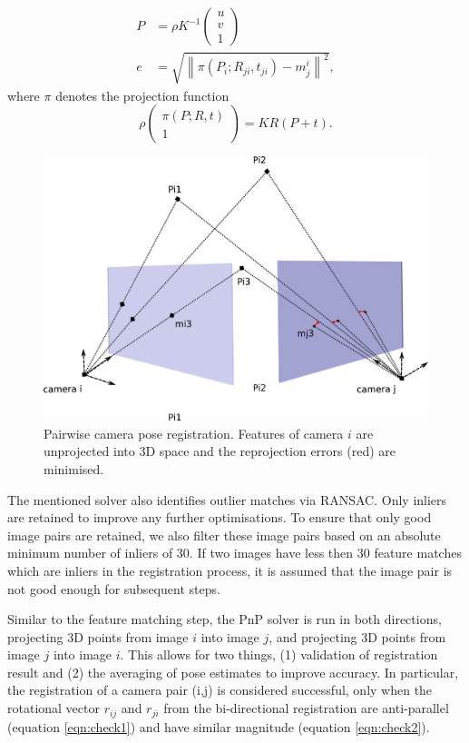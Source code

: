 \documentclass[10pt,twocolumn,letterpaper]{article}
\newcommand{\norm}[1]{\left\lVert #1 \right\rVert}
\begin{document}
\begin{align}
P &= \rho K^{-1} \begin{pmatrix}
u\\v\\1
\end{pmatrix} \label{eqn:backprojection}\\
e &= \sqrt{\norm{\pi\left(P_{i};R_{ji},t_{ji}\right)-m^i_{j}}^2},\label{eqn:reprojerror}
\end{align}
where $\pi$ denotes the projection function \[
\rho
\begin{pmatrix}
\pi\left(P;R,t\right)\\1
\end{pmatrix} = KR\left(P+t\right).
\]


\begin{figure}[t]
\begin{center}
   \includegraphics[width=0.9\linewidth]{figures/registration.pdf}
\end{center}
\caption{Pairwise camera pose registration. Features of camera $i$ are unprojected into 3D space and the reprojection errors (red) are minimised.}
\label{fig:reg}
\end{figure}

The mentioned solver also identifies outlier matches via RANSAC. Only inliers
are retained to improve any further optimisations. To ensure that only good
image pairs are retained, we also filter these image pairs based on an absolute
minimum number of inliers of 30. If two images have less then 30 feature matches
which are inliers in the registration process, it is assumed that the image pair
is not good enough for subsequent steps.

Similar to the feature matching step, the PnP solver is run in both directions,
projecting 3D points from image $i$ into image $j$, and projecting 3D points
from image $j$ into image $i$. This allows for two things, (1) validation of registration result and (2) the averaging of
pose estimates to improve accuracy. In particular, the registration of a camera pair (i,j) is considered successful, only when the rotational vector $r_{ij}$ and $r_{ji}$ from the bi-directional registration are anti-parallel (equation \ref{eqn:check1}) and have similar magnitude (equation \ref{eqn:check2}).
\end{document}
